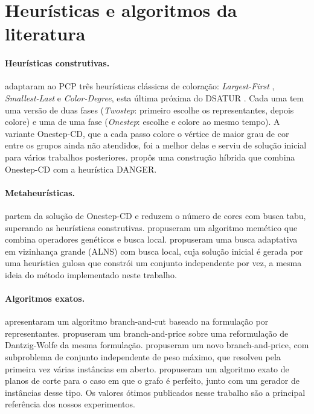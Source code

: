 \documentclass[12pt]{article}
\begin{document}
\section{Heurísticas e algoritmos da literatura}\label{sec:literatura}

\paragraph{Heurísticas construtivas.} \cite{li2000} adaptaram ao PCP três
heurísticas clássicas de coloração: \emph{Largest-First}
\cite{welsh1967}, \emph{Smallest-Last} e \emph{Color-Degree}, esta última
próxima do DSATUR \cite{brelaz1979}. Cada uma tem uma versão de duas fases
(\emph{Twostep}: primeiro escolhe os representantes, depois colore) e uma de
uma fase (\emph{Onestep}: escolhe e colore ao mesmo tempo). A variante
Onestep-CD, que a cada passo colore o vértice de maior grau de cor entre os
grupos ainda não atendidos, foi a melhor delas e serviu de solução inicial para
vários trabalhos posteriores. \cite{fritz2013} propôs uma construção híbrida
que combina Onestep-CD com a heurística DANGER.

\paragraph{Metaheurísticas.} \cite{noronha2006} partem da solução de
Onestep-CD e reduzem o número de cores com busca tabu, superando as heurísticas
construtivas. \cite{pop2013} propuseram um algoritmo memético que combina
operadores genéticos e busca local. \cite{furini2018} propuseram uma busca
adaptativa em vizinhança grande (ALNS) com busca local, cuja solução inicial é
gerada por uma heurística gulosa que constrói um conjunto independente por vez,
a mesma ideia do método implementado neste trabalho.

\paragraph{Algoritmos exatos.} \cite{frota2010} apresentaram um algoritmo
branch-and-cut baseado na formulação por representantes.
\cite{hoshino2011} propuseram um branch-and-price sobre uma reformulação de
Dantzig-Wolfe da mesma formulação. \cite{furini2018} propuseram um novo
branch-and-price, com subproblema de conjunto independente de peso máximo, que
resolveu pela primeira vez várias instâncias em aberto. \cite{seker2021}
propuseram um algoritmo exato de planos de corte para o caso em que o grafo é
perfeito, junto com um gerador de instâncias desse tipo. Os valores ótimos
publicados nesse trabalho são a principal referência dos nossos experimentos.
\end{document}
